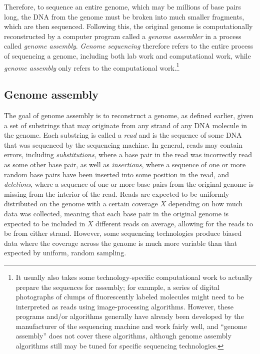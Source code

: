 \documentclass[10pt]{article}
\newcommand{\KeyTerm}[1]{{\it #1}}
\begin{document}
Therefore, to sequence an entire genome, which may be millions of base pairs
long, the DNA from the genome must be broken into much smaller fragments, which
are then sequenced.  Following this, the original genome is computationally
reconstructed by a computer program called a \KeyTerm{genome assembler} in a
process called \KeyTerm{genome assembly}.  \KeyTerm{Genome sequencing} therefore
refers to the entire process of sequencing a genome, including both lab work and
computational work, while \KeyTerm{genome assembly} only refers to the
computational work.\footnote{It usually also takes some technology-specific
computational work to actually prepare the sequences for assembly; for example,
a series of digital photographs of clumps of fluorescently labeled molecules
might need to be interpreted as reads using image-processing algorithms.
However, these programs and/or algorithms generally have already been developed
by the manufacturer of the sequencing machine and work fairly well, and ``genome
assembly'' does not cover these algorithms, although genome assembly algorithms
still may be tuned for specific sequencing technologies.}

\subsection{Genome assembly}

\label{subsec:reads}

The goal of genome assembly is to reconstruct a genome, as defined earlier,
given a set of substrings that may originate from any strand of any DNA molecule
in the genome.  Each substring is called a \KeyTerm{read} and is the sequence of
some DNA that was sequenced by the sequencing machine.  In general, reads may
contain errors, including \KeyTerm{substitutions}, where a base pair in the read
was incorrectly read as some other base pair, as well as \KeyTerm{insertions},
where a sequence of one or more random base pairs have been inserted into some
position in the read, and \KeyTerm{deletions}, where a sequence of one or more
base pairs from the original genome is missing from the interior of the read.
Reads are expected to be uniformly distributed on the genome with a certain
coverage $X$ depending on how much data was collected, meaning that each base
pair in the original genome is expected to be included in $X$ different reads on
average, allowing for the reads to be from either strand.  However, some
sequencing technologies produce biased data where the coverage across the genome
is much more variable than that expected by uniform, random sampling.
\end{document}
